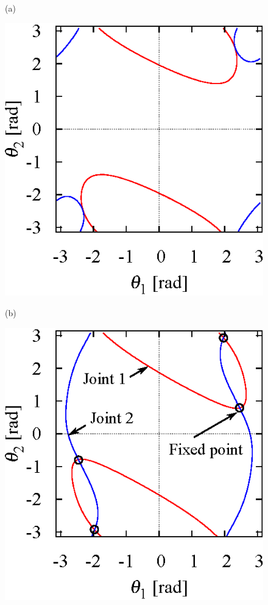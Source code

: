 \begin{figure}[t]
\begin{minipage}[t]{0.30\linewidth}
    \footnotesize\par{(a)}
    \hspace{2mm}
  \end{minipage}
  \begin{minipage}[t]{0.30\linewidth}
    \centering
    \includegraphics[width=1.0\linewidth]{fig/chapter3/planar/0.945_nullclines.eps}
    \footnotesize\par{(b)}
    \hspace{2mm}
  \end{minipage}
  \begin{minipage}[t]{0.30\linewidth}
    \centering
    \includegraphics[width=1.0\linewidth]{fig/chapter3/planar/1.5_nullclines.eps}

\end{minipage}
\end{figure}

